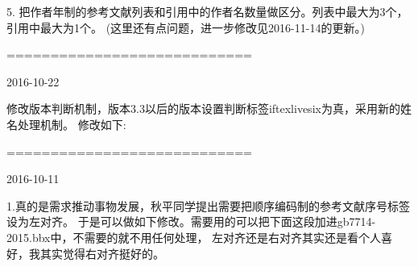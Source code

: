 5. 把作者年制的参考文献列表和引用中的作者名数量做区分。列表中最大为3个，引用中最大为1个。
(这里还有点问题，进一步修改见2016-11-14的更新。)
\begin{texlist}
%
\end{texlist}

============================

2016-10-22

修改版本判断机制，版本3.3以后的版本设置判断标签iftexlivesix为真，采用新的姓名处理机制。
修改如下:


============================

2016-10-11

1.真的是需求推动事物发展，秋平同学提出需要把顺序编码制的参考文献序号标签设为左对齐。
于是可以做如下修改。需要用的可以把下面这段加进gb7714-2015.bbx中，不需要的就不用任何处理，
左对齐还是右对齐其实还是看个人喜好，我其实觉得右对齐挺好的。
\begin{texlist}
\end{texlist}

